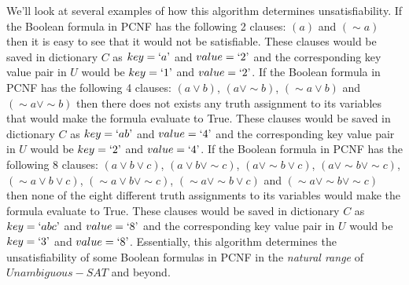 \documentclass[runningheads,a4paper]{llncs}
\let\oldsim\sim
\renewcommand{\sim}{{\oldsim}}
\begin{document}
We'll look at several examples of how this algorithm determines unsatisfiability. If the Boolean formula in PCNF has the following 2 clauses: $(a)$ and $(\sim a)$ then it is easy to see that it would not be satisfiable. These clauses would be saved in dictionary $C$ as $key=`a\textrm'$ and $value=`2\textrm'$ and the corresponding key value pair in $U$ would be $key=`1\textrm'$ and $value=`2\textrm'$. If the Boolean formula in PCNF has the following 4 clauses: $({a}\vee {b})$, $({a}\vee \sim {b})$, $(\sim {a}\vee {b})$ and $(\sim {a}\vee \sim {b})$ then there does not exists any truth assignment to its variables that would make the formula evaluate to True. These clauses would be saved in dictionary $C$ as $key=`ab\textrm'$ and $value=`4\textrm'$ and the corresponding key value pair in $U$ would be $key=`2\textrm'$ and $value=`4\textrm'$. If the Boolean formula in PCNF has the following 8 clauses: $({a}\vee {b} \vee {c})$, $({a}\vee {b} \vee \sim {c})$, $({a}\vee \sim {b} \vee {c})$, $({a}\vee \sim {b} \vee \sim {c})$, $(\sim {a}\vee {b} \vee {c})$, $(\sim {a}\vee {b} \vee \sim {c})$, $( \sim {a}\vee \sim {b} \vee {c})$ and $( \sim {a}\vee \sim {b} \vee \sim {c})$ then none of the eight different truth assignments to its variables would make the formula evaluate to True. These clauses would be saved in dictionary $C$ as $key=`abc\textrm'$ and $value=`8\textrm'$ and the corresponding key value pair in $U$ would be $key=`3\textrm'$ and $value=`8\textrm'$. Essentially, this algorithm determines the unsatisfiability of some Boolean formulas in PCNF in the \emph{natural range} of ${Unambiguous-SAT}$ and beyond. 
 
\end{document}
